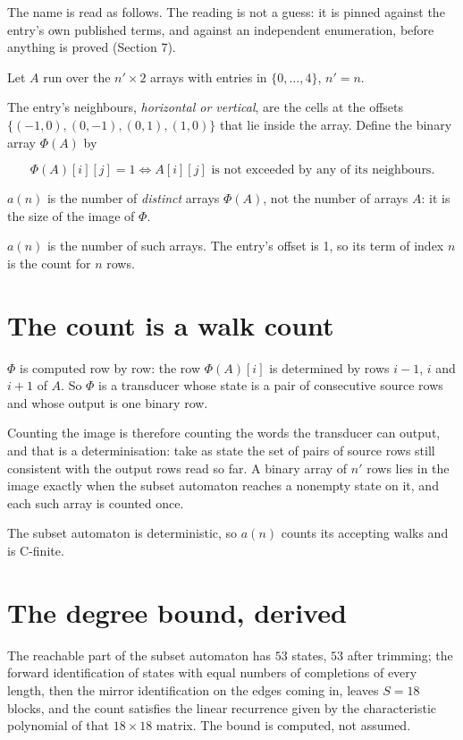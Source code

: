 \documentclass[11pt]{article}
\theoremstyle{definition}
\begin{document}
The name is read as follows. The reading is not a guess: it is pinned against the entry's own published terms, and against an independent enumeration, before anything is proved (Section 7).

Let $A$ run over the $n' \times 2$ arrays with entries in $\{0,\dots,4\}$, $n' = n$.

The entry's neighbours, {\itshape horizontal or vertical}, are the cells at the offsets $\{(-1,0), (0,-1), (0,1), (1,0)\}$ that lie inside the array. Define the binary array $\Phi(A)$ by

\[\Phi(A)[i][j] = 1 \iff A[i][j] \text{ is not exceeded by any of its neighbours}.\]

$a(n)$ is the number of {\itshape distinct} arrays $\Phi(A)$, not the number of arrays $A$: it is the size of the image of $\Phi$.

$a(n)$ is the number of such arrays. The entry's offset is 1, so its term of index $n$ is the count for $n$ rows.

\section{The count is a walk count}

$\Phi$ is computed row by row: the row $\Phi(A)[i]$ is determined by rows $i-1$, $i$ and $i+1$ of $A$. So $\Phi$ is a transducer whose state is a pair of consecutive source rows and whose output is one binary row.

Counting the image is therefore counting the words the transducer can output, and that is a determinisation: take as state the set of pairs of source rows still consistent with the output rows read so far. A binary array of $n'$ rows lies in the image exactly when the subset automaton reaches a nonempty state on it, and each such array is counted once.

The subset automaton is deterministic, so $a(n)$ counts its accepting walks and is C-finite.

\section{The degree bound, derived}

The reachable part of the subset automaton has $53$ states, $53$ after trimming; the forward identification of states with equal numbers of completions of every length, then the mirror identification on the edges coming in, leaves $S = 18$ blocks, and the count satisfies the linear recurrence given by the characteristic polynomial of that $18\times18$ matrix. The bound is computed, not assumed.
\end{document}
